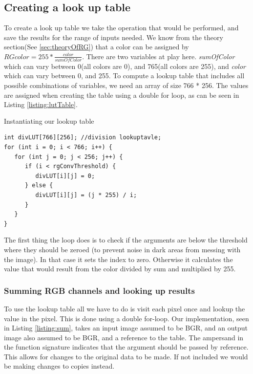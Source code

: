 \subsection{Creating a look up table}
To create a look up table we take the operation that would be performed, and save the results for the range of inputs needed. We know from the theory section(See \autoref{sec:theoryOfRG}) that a color can be assigned by $RGcolor = 255 * \frac{color}{sumOfColor}$. There are two variables at play here. \textit{sumOfColor} which can vary between 0(all colors are 0), and 765(all colors are 255), and \textit{color} which can vary between 0, and 255. To compute a lookup table  that includes all possible combinations of variables, we need an array of size 766 * 256. The values are assigned when creating the table using a double for loop, as can be seen in Listing \ref{listing:lutTable}.
\begin{listing}[H]
\caption{Instantiating our lookup table}
\label{listing:lutTable}
\begin{verbatim}
int divLUT[766][256]; //division lookuptavle;
for (int i = 0; i < 766; i++) {
   for (int j = 0; j < 256; j++) {
      if (i < rgConvThreshold) { 
         divLUT[i][j] = 0;
      } else {
         divLUT[i][j] = (j * 255) / i;
      }
   }
}
\end{verbatim}
\end{listing}
The first thing the loop does is to check if the arguments are below the threshold where they should be zeroed (to prevent noise in dark areas from messing with the image). In that case it sets the index to zero. Otherwise it calculates the value that would result from the color  divided by sum  and multiplied by 255.
\subsubsection{Summing RGB channels and looking up results}
To use the lookup table all we have to do is visit each pixel once and lookup the value in the pixel. This is done using a double for-loop. Our implementation, seen in Listing \ref{listing:sum}, takes an input image assumed to be BGR, and an output image also assumed to be BGR, and a reference to the table. The ampersand \codeword{&} in the function signature indicates that the argument should be passed by reference. This allows for changes to the original data to be made. If not included we would be making changes to copies instead.\\

